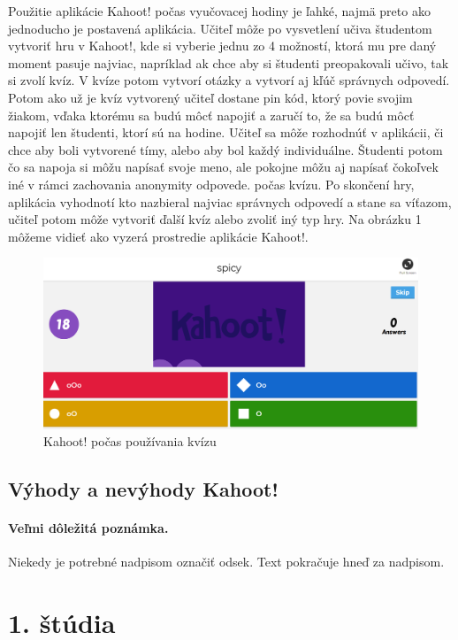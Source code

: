 \documentclass[10pt,oneside,slovak,a4paper]{article}
\begin{document}
Použitie aplikácie Kahoot! počas vyučovacej hodiny je ľahké, najmä preto ako jednoducho je postavená aplikácia. Učiteľ môže po vysvetlení učiva študentom vytvoriť hru v Kahoot!, kde si vyberie jednu zo 4 možností, ktorá mu pre daný moment pasuje najviac, napríklad ak chce aby si študenti preopakovali učivo, tak si zvolí kvíz. V kvíze potom vytvorí otázky a vytvorí aj kľúč správnych odpovedí. Potom ako už je kvíz vytvorený učiteľ dostane pin kód, ktorý povie svojim žiakom, vďaka ktorému sa budú môcť napojiť a zaručí to, že sa budú môcť napojiť len študenti, ktorí sú na hodine. Učiteľ sa môže rozhodnúť v aplikácii, či chce aby boli vytvorené tímy, alebo aby bol každý individuálne. Študenti potom čo sa napoja si môžu napísať svoje meno, ale pokojne môžu aj napísať čokoľvek iné v rámci zachovania anonymity odpovede.  počas kvízu. Po skončení hry, aplikácia vyhodnotí kto nazbieral najviac správnych odpovedí a stane sa víťazom, učiteľ potom môže vytvoriť ďalší kvíz alebo zvoliť iný typ hry. Na obrázku 1 môžeme vidieť ako vyzerá prostredie aplikácie Kahoot!.
\begin{figure} %
\centering
\includegraphics[width=\textwidth]{Kahoot.png}
\caption{Kahoot! počas používania kvízu}
\label{duo-uzivatelia}
\end{figure}


\subsection{Výhody a nevýhody Kahoot!} \label{ina:este}

\paragraph{Veľmi dôležitá poznámka.}
Niekedy je potrebné nadpisom označiť odsek. Text pokračuje hneď za nadpisom.



\section{1. štúdia} \label{dolezita}
\end{document}

